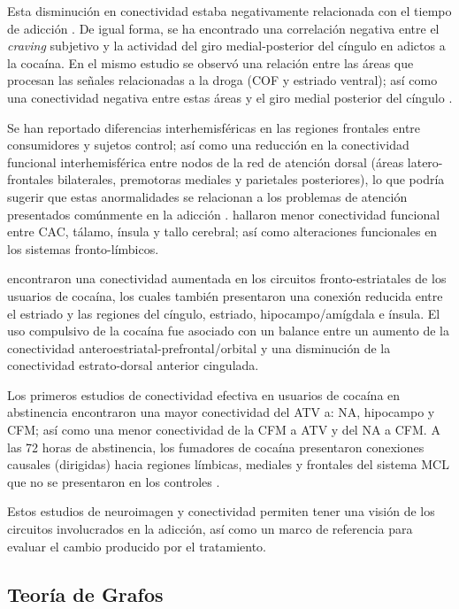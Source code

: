 Esta disminución en conectividad estaba negativamente relacionada con el tiempo de adicción \parencite{Gu2010}.
De igual forma, se ha encontrado una correlación negativa entre el \textit{craving} subjetivo y la actividad del giro medial-posterior del cíngulo en adictos a la cocaína.
En el mismo estudio se observó una relación entre las áreas que procesan las señales relacionadas a la droga (COF y estriado ventral);
así como una conectividad negativa entre estas áreas y el giro medial posterior del cíngulo \parencite{Wilcox2011}.\par
Se han reportado diferencias interhemisféricas en las regiones frontales entre consumidores y sujetos control; así como una reducción en la conectividad funcional interhemisférica entre nodos de la red de atención dorsal (áreas latero-frontales bilaterales, premotoras mediales y parietales posteriores), lo que podría sugerir que estas anormalidades se relacionan a los problemas de atención presentados comúnmente en la adicción \parencite{Kelly2011a}.
\textcite{Verdejo-Garcia2014} hallaron menor conectividad funcional entre CAC, tálamo, ínsula y tallo cerebral; así como alteraciones funcionales en los sistemas fronto-límbicos.\par
\textcite{Hu2015} encontraron una conectividad aumentada en los circuitos fronto-estriatales de los usuarios de cocaína, los cuales también presentaron una conexión reducida entre el estriado y las regiones del cíngulo, estriado, hipocampo/amígdala e ínsula. El uso compulsivo de la cocaína fue asociado con un balance entre un aumento de la conectividad anteroestriatal-prefrontal/orbital y una disminución de la conectividad estrato-dorsal anterior cingulada.\par
Los primeros estudios de conectividad efectiva en usuarios de cocaína en abstinencia encontraron una mayor conectividad del ATV a: NA, hipocampo y CFM; así como una menor conectividad de la CFM a ATV y del NA a CFM.
A las 72 horas de abstinencia, los fumadores de cocaína presentaron conexiones causales (dirigidas) hacia regiones límbicas, mediales y frontales del sistema MCL que no se presentaron en los controles \parencite{Ray2017,Ray2016}.\par
Estos estudios de neuroimagen y conectividad permiten tener una visión de los circuitos involucrados en la adicción, así como un marco de referencia para evaluar el cambio producido por el tratamiento.
\subsection{Teoría de Grafos}


